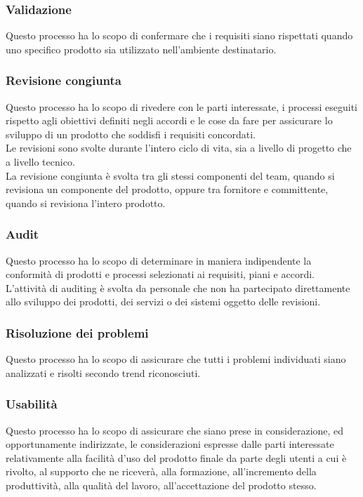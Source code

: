\subsubsection{Validazione}
Questo processo ha lo scopo di confermare che i requisiti siano rispettati quando uno specifico prodotto sia utilizzato nell'ambiente destinatario.

\subsubsection{Revisione congiunta}
Questo processo ha lo scopo di rivedere con le parti interessate, i processi eseguiti rispetto agli obiettivi definiti negli accordi e le cose da fare per assicurare lo sviluppo di un prodotto che soddisfi i requisiti concordati.\\
Le revisioni sono svolte durante l'intero ciclo di vita, sia a livello di progetto che a livello tecnico.\\
La revisione congiunta è svolta tra gli stessi componenti del team, quando si revisiona un componente del prodotto, oppure tra fornitore e committente, quando si revisiona l'intero prodotto.

\subsubsection{Audit}
Questo processo ha lo scopo di determinare in maniera indipendente la conformità di prodotti e processi selezionati ai requisiti, piani e accordi.\\
L'attività di auditing è svolta da personale che non ha partecipato direttamente allo sviluppo dei prodotti, dei servizi o dei sistemi oggetto delle revisioni.

\subsubsection{Risoluzione dei problemi}
Questo processo ha lo scopo di assicurare che tutti i problemi individuati siano analizzati e risolti secondo trend riconosciuti.

\subsubsection{Usabilità}
Questo processo ha lo scopo di assicurare che siano prese in considerazione, ed opportunamente indirizzate, le considerazioni espresse dalle parti interessate relativamente alla facilità d'uso del prodotto finale da parte degli utenti a cui è rivolto, al supporto che ne riceverà, alla formazione, all'incremento della produttività, alla qualità del lavoro, all'accettazione del prodotto stesso. 

